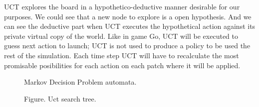 \documentclass[11pt,oneside,a4paper,openright]{report}
\begin{document}
UCT explores the board in a hypothetico-deductive manner desirable for our purposes. We could
see that a new node to explore is a open hypothesis. And we can see the deductive part when UCT executes the hypothetical action against its private virtual copy of the world. Like in game Go, UCT will be executed to guess next action to launch; UCT is not used to produce a policy to be used the rest of the simulation. Each time step UCT will have to recalculate the most promisable posibilities for each action on each patch where it will be applied. 

\begin{figure}[h!]
\centering
\setlength\fboxsep{0pt}
\setlength\fboxrule{0.5pt}
\caption{ Markov Decision Problem automata.}
\label{fig:mdp1}
\end{figure}


\begin{figure}[h!]
\centering
\setlength\fboxsep{0pt}
\setlength\fboxrule{0.5pt}
\caption{Figure. Uct search tree.}
\label{fig:uctTree}
\end{figure}
\end{document}
